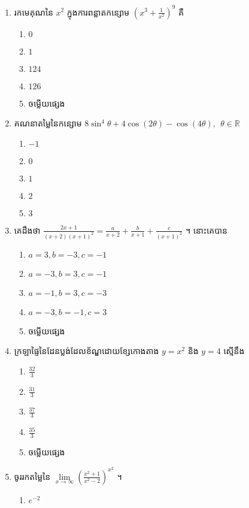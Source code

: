 \documentclass[12pt, a4paper]{article}
\begin{document}
\begin{enumerate}[m]
	\item រកមេគុណនៃ $x^2$ ក្នុងការពន្លាតកន្សោម $\left(x^3+\frac{1}{x^2}\right)^9$ គឺ
	\begin{enumerate}[k,5]
		\item $0$
		\item $1$
		\item $124$
		\item $126$
		\item ចម្លើយផ្សេង
	\end{enumerate}
	{\color{blue}\hrulefill}
	\item គណនាតម្លៃនៃកន្សោម $8\sin^4\theta+4\cos\left(2\theta\right)-\cos\left(4\theta\right),~~\theta\in\mathbb{R}$
	\begin{enumerate}[k,5]
		\item $-1$
		\item $0$
		\item $1$
		\item $2$
		\item $3$
	\end{enumerate}
	{\color{blue}\hrulefill}
	\item គេដឹងថា $\frac{2x+1}{\left(x+2\right)\left(x+1\right)^2}=\frac{a}{x+2}+\frac{b}{x+1}+\frac{c}{\left(x+1\right)^2}$ ។ នោះគេបាន
	\begin{enumerate}[k,3]
		\item $a=3,b=-3,c=-1$
		\item $a=-3,b=3,c=-1$
		\item $a=-1,b=3,c=-3$
		\item $a=-3,b=-1,c=3$
		\item ចម្លើយផ្សេង
	\end{enumerate}
	{\color{blue}\hrulefill}
	\item ក្រឡាផ្ទៃនៃដែនប្លង់ដែលខ័ណ្ឌដោយខ្សែកោងតាង $y=x^2$ និង $y=4$ ស្មើនឹង 
	\begin{enumerate}[k,5]
		\item $\frac{32}{3}$
		\item $\frac{31}{3}$
		\item $\frac{37}{3}$
		\item $\frac{35}{3}$
		\item ចម្លើយផ្សេង
	\end{enumerate}
	{\color{blue}\hrulefill}
	\item ចូររកតម្លៃនៃ $\lim\limits_{x\to\infty}\left(\frac{x^2+1}{x^2-2}\right)^{x^{2}}$ ។
	\begin{enumerate}[k,5]
		\item $e^{-2}$

\end{enumerate}
\end{enumerate}
\end{document}
